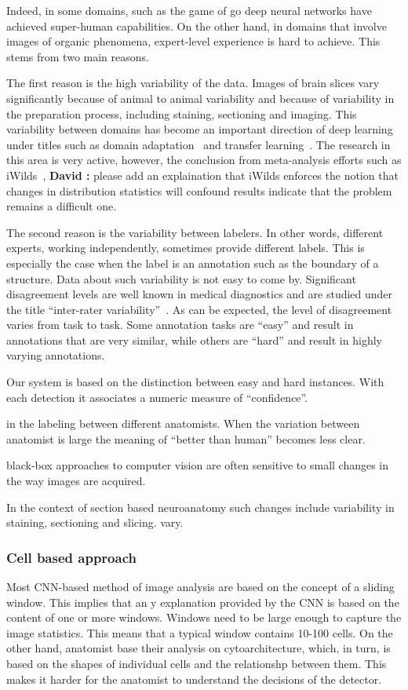 \documentclass[runningheads]{llncs}
\newcommand{\comment}[3]{{\color{#1} {\bf #2 :} #3}}
\newcommand{\david}[1]{\comment{cyan}{David}{#1}}
\begin{document}
\begin{enumerate}
Indeed, in some domains, such as the game of go \cite{} deep neural
networks have achieved super-human capabilities. On the other hand, in
domains that involve images of organic phenomena, expert-level
experience is hard to achieve. This stems from two main reasons.

The first reason is the high variability of the data. Images
of brain slices vary significantly because of animal to animal
variability and because of variability in the preparation process,
including staining, sectioning and imaging. This variability between
domains has become an important direction of deep learning under
titles such as domain adaptation~\cite{wang2018deep} and transfer
learning~\cite{weiss2016survey}. The research in this area is very
active, however, the conclusion from meta-analysis efforts such as
iWilds~\cite{}, \david{please add an explaination that iWilds enforces the notion that changes in distribution statistics will confound results} indicate that the problem remains a difficult one.

The second reason is the variability between labelers. In other words,
different experts, working independently, sometimes provide different
labels. This is especially the case when the label is an annotation
such as the boundary of a structure. Data about such variability is
not easy to come by. Significant disagreement levels are well known in
medical diagnostics and are studied under the title ``inter-rater
variability''~\cite{gellhorn2013inter}. As can be expected, the level
of disagreement varies from task to task. Some annotation tasks are
``easy'' and result in annotations that are very similar, while others
are ``hard'' and result in highly varying annotations.

Our system is based on the distinction between easy and hard
instances. With each detection it associates a numeric measure of
``confidence''.


in the labeling between different anatomists. When the variation
between anatomist is large the meaning of ``better than human''
becomes less clear.


black-box approaches to computer vision
are often sensitive to small changes in the way images are acquired.

In the context of section based neuroanatomy such changes include
variability in staining, sectioning and slicing.
vary.

\subsubsection{Cell based approach}  Most CNN-based method of image
analysis are based on the concept of a sliding window. This implies
that an
y explanation provided by the CNN is based on the content of one or more windows. Windows need to be large enough to capture the image statistics. This means that a typical window contains 10-100 cells.
On the other hand, anatomist base their analysis on cytoarchitecture, which, in turn, is based on the shapes of individual cells and the relationshp between them. This makes it harder for the anatomist to understand the decisions of the detector.


\end{enumerate}
\end{document}
